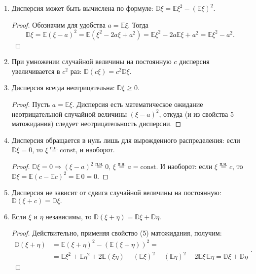 \begin{enumerate}

    \item 
        Дисперсия может быть вычислена по формуле: $\mathbb{D}\xi = \mathbb{E}\xi^2 - (\mathbb{E}\xi)^2$.
    
        \begin{proof}
            Обозначим для удобства $a = \mathbb{E}\xi.$ Тогда
        $$\mathbb{D} \xi=\mathbb{E}(\xi-a)^{2}=\mathbb{E}\left(\xi^{2}-2 a \xi+a^{2}\right)=\mathbb{E} \xi^{2}-2 a \mathbb{E} \xi+a^{2}=\mathbb{E} \xi^{2}-a^{2}.$$
        \end{proof} 
    
    \item 
        При умножении случайной величины на постоянную $c$ дисперсия увеличивается в $c^2$ раз: $\mathbb{D}(c\xi) = c^2\mathbb{D}\xi.$
    \item 
        Дисперсия всегда неотрицательна: $\mathbb{D}\xi \geqslant 0.$
    
        \begin{proof}
            Пусть $a = \mathbb{E}\xi.$ Дисперсия есть математическое ожидание неотрицательной случайной величины $(\xi - a)^2$, откуда (и из свойства 5 матожидания) следует неотрицательность дисперсии.
        \end{proof}
    
    \item 
        Дисперсия обращается в нуль лишь для вырожденного распределения: если $\mathbb{D}\xi = 0$, то $\xi \overset{\text{п.н.}}{=} \text{const}$, и наоборот.
    
        \begin{proof}
            $\mathbb{D}\xi = 0 \Rightarrow (\xi - a)^2 \overset{\text{п.н.}}{=} 0, \, \xi \overset{\text{п.н.}}{=} a =\text{const}$. И наоборот: если $\xi \overset{\text{п.н.}}{=} c$, то $\mathbb{D} \xi=\mathbb{E}(c-\mathbb{E} c)^{2}=\mathbb{E} \, 0=0.$
        \end{proof} 
    
    \item 
        Дисперсия не зависит от сдвига случайной величины на постоянную: $\mathbb{D}(\xi + c) = \mathbb{D}\xi.$
    
    \item 
        Если $\xi$ и $\eta$ независимы, то $\mathbb{D}(\xi + \eta) = \mathbb{D}\xi + \mathbb{D}\eta.$
    
        \begin{proof}
        Действительно, применяя свойство (5) матожидания, получим:
        $$\begin{aligned}
        \mathbb{D}(\xi+\eta) &=\mathbb{E}(\xi+\eta)^{2}-(\mathbb{E}(\xi+\eta))^{2}=\\
        &=\mathbb{E} \xi^{2}+\mathbb{E} \eta^{2}+2 \mathbb{E}(\xi \eta)-(\mathbb{E} \xi)^{2}-(\mathbb{E} \eta)^{2}-2 \mathbb{E} \xi \, \mathbb{E} \eta=\mathbb{D} \xi+\mathbb{D} \eta
        \end{aligned}.$$
        \end{proof}
        

\end{enumerate}
